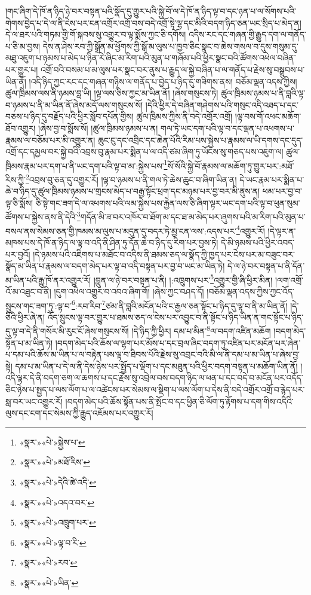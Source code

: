 །གང་ཞིག་དེ་ཁོ་ན་ཉིད་ཉེ་བར་བསྟན་པའི་སྣོད་དུ་གྱུར་པའི་སྐྱེ་བོ་ལ་དེ་ཁོ་ན་ཉིད་ལྟ་བ་དང་ཉན་པ་ལ་སོགས་པའི་གེགས་བྱེད་པ་དེ་ལ་ནི་ངེས་པར་ངན་འགྲོར་འགྲོ་བས་བདེ་འགྲོ་སྟེ་ལྷ་དང་མིའི་བདག་ཉིད་ཅན་ཡང་སྲིད་པ་མེད་ན། དེ་ལ་ཐར་པའི་གཏམ་གྱི་གོ་སྐབས་སུ་འགྱུར་བ་ལྟ་སྨོས་ཀྱང་ཅི་དགོས། འདིས་རང་དང་གཞན་གྱི་རྒྱུད་དག་ལ་གནོད་པ་ཅི་མ་བྱས། དེས་ན་ཤེས་རབ་ཀྱི་སྒྲོན་མ་ཕྱོགས་ཀྱི་སྒོ་མ་ལུས་པ་ཁྱབ་ཅིང་སྣང་བ་ཆེས་གསལ་བ་དུས་གསུམ་དུ་མཐུ་འཇུག་པ་ཉམས་པ་མེད་པ་ཉིན་རེ་ཞིང་མ་རིག་པའི་མུན་པ་གཞོམ་པའི་ཕྱིར་སྣང་བའི་ཚོགས་འཕེལ་བཞིན་པར་གྱུར་པ། འགྲོ་བའི་བསམ་པ་མ་ལུས་པར་སྣང་བར་ནུས་པ་རྒྱུད་ལ་སྐྱེ་བཞིན་པ་ལ་གནོད་པ་རྗེས་སུ་བསྒྲུབས་པ་ཡིན་ནོ། །འདི་ཉིད་ཀྱང་རང་དང་གཞན་གཉིས་ལ་གནོད་པ་བྱེད་པ་ཉིད་དུ་གཟིགས་ནས། བཅོམ་ལྡན་འདས་ཀྱིས། ཚུལ་ཁྲིམས་ལས་ནི་ཉམས་བླ་ཡི། །ལྟ་ལས་ཅིས་ཀྱང་མ་ཡིན་ནོ། །ཞེས་གསུངས་ཏེ། ཚུལ་ཁྲིམས་ཉམས་པ་ནི་བླའི་ལྟ་བ་ཉམས་པ་ནི་མ་ཡིན་ནོ་ཞེས་མདོ་ལས་གསུངས་སོ། །དེའི་ཕྱིར་དེ་བཞིན་གཤེགས་པའི་གསུང་འདི་འཐད་པ་དང་བཅས་པ་ཉིད་དུ་བརྗོད་པའི་ཕྱིར་སློབ་དཔོན་གྱིས། ཚུལ་ཁྲིམས་ཀྱིས་ནི་བདེ་འགྲོར་འགྲོ། །ལྟ་བས་གོ་འཕང་མཆོག་ཐོབ་འགྱུར། །ཞེས་བྱ་བ་སྨོས་སོ། །ཚུལ་ཁྲིམས་ཉམས་པ་ན། གལ་ཏེ་ཡང་དག་པའི་ལྟ་བ་དང་ལྡན་པ་འཕགས་པ་རྣམས་ལ་བཅོམ་པར་མི་འགྱུར་ན། ཆུང་ངུ་དང་འབྲིང་དང་ཆེན་པོའི་རིམ་པས་སྐྱེས་པ་རྣམས་ལ་ཡི་དགས་དང་དུད་འགྲོ་དང་དམྱལ་བར་སྐྱེ་བའི་འབྲས་བུ་རྣམ་པར་སྨིན་པ་ལ་འདི་ཙམ་ཞིག་ཏུ་ཡོངས་སུ་གཅད་པས་འཇུག་ལ། ཚུལ་ཁྲིམས་རྣམ་པར་དག་པ་ནི་ཡང་དག་པའི་ལྟ་བ་མ་:སྐྱེས་པས་\footnote{«སྣར་»«པེ་»སྐྱེས་པ་}སོ་སོའི་སྐྱེ་བོ་རྣམས་ལ་མཆོག་ཏུ་གྱུར་པར་:མཐོ་རིས་ཀྱི་\footnote{«སྣར་»«པེ་»མཐོ་རིས་}འབྲས་བུ་ཅན་དུ་འགྱུར་རོ། །ལྟ་བ་ཉམས་པ་ནི་གལ་ཏེ་ཆེས་ཆུང་བ་ཞིག་ཡིན་ན། དེ་ཡང་རྣམ་པར་སྨིན་པ་ཆེ་བ་ཉིད་དུ་ཚུལ་ཁྲིམས་ཉམས་པ་གྲངས་མེད་པ་བརྒྱ་སྟོང་ཕྲག་དང་མཉམ་པར་བྱ་བར་མི་ནུས་ན། ཕམ་པར་བྱ་བ་ལྟ་ཅི་སྨོས། ཅི་སྟེ་གང་ཟག་དེ་ལ་འཕགས་པའི་ལམ་སྐྱེས་པས་རྐྱེན་ལས་ཅི་ཞིག་ལྟར་ཡང་དག་པའི་ལྟ་བ་ཕུན་སུམ་ཚོགས་པ་སྐྱེས་ནས་ནི་དེའི་\footnote{«སྣར་»«པེ་»དེའི་ཚེ་འདི་}གདོན་མི་ཟ་བར་འཁོར་བ་ཐོག་མ་དང་ཐ་མ་མེད་པར་ཞུགས་པའི་མ་རིག་པའི་མུན་པ་བསལ་ནས་སེམས་ཅན་གྱི་ཁམས་མ་ལུས་པ་མདུན་དུ་བདར་ཏེ་མྱ་ངན་ལས་:འདས་པར་\footnote{«སྣར་»«པེ་»འདའ་བར་}འགྱུར་རོ། །དེ་ལྟར་ན་མཁས་པས་དེ་ཁོ་ན་ཉིད་ལ་ལྟ་བ་འདི་ནི་ཤིན་ཏུ་དོན་ཆེ་བ་ཉིད་དུ་རིག་པར་བྱས་ཏེ། དེ་མི་ཉམས་པའི་ཕྱིར་འབད་པར་བྱའོ། །དེ་ཉམས་པའི་འཇིགས་པ་མཐོང་བ་འདིས་ནི་ཐམས་ཅད་ལ་སྣོད་ཀྱི་ཁྱད་པར་ངེས་པར་མ་བཟུང་བར་སྣོད་མ་ཡིན་པ་རྣམས་ལ་བདག་མེད་པར་ལྟ་བ་འདི་བསྟན་པར་བྱ་བ་ཡང་མ་ཡིན་ཏེ། དེ་ལ་ཉེ་བར་བསྟན་པ་ནི་དོན་མ་ཡིན་པའི་རྒྱུ་ཁོ་ནར་འགྱུར་རོ། །བླུན་ལ་ཉེ་བར་བསྟན་པ་ནི། །:འཁྲུགས་པར་\footnote{«སྣར་»«པེ་»འཁྲུག་པར་}འགྱུར་གྱི་ཞི་ཕྱིར་མིན། །ལག་འགྲོ་འོ་མ་འཐུང་བ་ནི། །དུག་འཕེལ་འགྱུར་བ་འབའ་ཞིག་གོ། །ཞེས་ཀྱང་བཤད་དོ། །བཅོམ་ལྡན་འདས་ཀྱིས་ཀྱང་འོད་སྲུངས་གང་ཟག་ཏུ་:ལྟ་བ་\footnote{«སྣར་»«པེ་»ལྟ་བ་རི་}:རབ་རིབ་\footnote{«སྣར་»«པེ་»རབ་}ཙམ་ནི་བླའི་མངོན་པའི་ང་རྒྱལ་ཅན་སྟོང་པ་ཉིད་དུ་ལྟ་བ་ནི་མ་ཡིན་ནོ། །དེ་ཅིའི་ཕྱིར་ཞེ་ན། འོད་སྲུངས་ལྟ་བར་གྱུར་པ་ཐམས་ཅད་ལ་ངེས་པར་འབྱུང་བ་ནི་སྟོང་པ་ཉིད་ཡིན་ན་གང་སྟོང་པ་ཉིད་དུ་ལྟ་བ་དེ་ནི་གསོར་མི་རུང་ངོ་ཞེས་གསུངས་སོ། །དེ་ཉིད་ཀྱི་ཕྱིར། དམ་པ་མིན་\footnote{«སྣར་»«པེ་»ཡིན་}ལ་བདག་འཛིན་མཆོག །བདག་མེད་སྟོན་པ་མ་ཡིན་ཏེ། །བདག་མེད་པའི་ཆོས་ལ་ལྷག་པར་མོས་པ་དང་བྲལ་ཞིང་བདག་ཏུ་འཛིན་པར་མངོན་པར་ཞེན་པ་དམ་པའི་ཆོས་མ་ཡིན་པ་ལ་བརྟེན་པས་ལྟ་བ་ཐིབས་པོའི་རྗེས་སུ་འབྲང་བའི་མི་ལ་ནི་དམ་པ་མ་ཡིན་པ་ཞེས་བྱ་སྟེ། དམ་པ་མ་ཡིན་པ་དེ་ལ་ནི་དེས་ཉེས་པར་སྤྱོད་པ་ལྡོག་པ་དང་མཐུན་པའི་ཕྱིར་བདག་བསྟན་པ་མཆོག་ཡིན་ནོ། །འདི་ལྟར་དེ་ནི་བདག་ཅག་ལ་ཆགས་པ་དང་རྗེས་སུ་འབྲེལ་བས་བདག་ཉིད་ལ་ཕན་པ་དང་བདེ་བ་མངོན་པར་འདོད་ཅིང་ཉེས་པ་སྤྱད་པ་ལས་ལོག་པ་ལ་འཚེངས་པར་སེམས་ལ་སྡིག་པ་ལས་ལོག་པ་དེས་ནི་བདེ་འགྲོར་འགྲོ་བ་རྙེད་པར་སླ་བར་ཡང་འགྱུར་རོ། །བདག་མེད་པའི་ཆོས་སྟོན་པས་ནི་སྤོང་བ་དང་ཕྱིན་ཅི་ལོག་ཏུ་རྟོགས་པ་དག་གིས་འདིའི་ལུས་དང་ངག་དང་སེམས་ཀྱི་རྒྱུད་འཇོམས་པར་འགྱུར་རོ། 